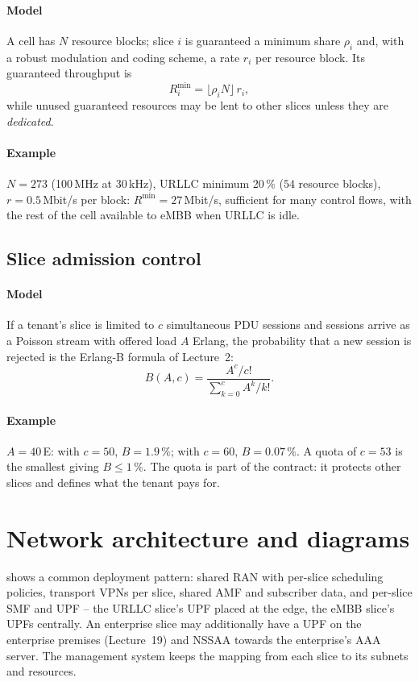 \documentclass[11pt,a4paper]{article}
\begin{document}
\paragraph{Model} A cell has $N$ resource blocks; slice $i$ is guaranteed a minimum share $\rho_i$ and, with a robust modulation and coding
scheme, a rate $r_i$ per resource block. Its guaranteed throughput is
\begin{equation}\label{eq:prb}
  R_i^{\min} = \lfloor\rho_i N\rfloor\, r_i ,
\end{equation}
while unused guaranteed resources may be lent to other slices unless they are \emph{dedicated}.
\paragraph{Example} $N = 273$ (100\,MHz at 30\,kHz), URLLC minimum 20\,\% ($54$ resource blocks), $r = 0.5$\,Mbit/s per block: $R^{\min} = 27$\,Mbit/s,
sufficient for many control flows, with the rest of the cell available to eMBB when URLLC is idle.

\subsection{Slice admission control}\label{sec:nsac}
\paragraph{Model} If a tenant's slice is limited to $c$ simultaneous PDU sessions and sessions arrive as a Poisson stream with offered load
$A$ Erlang, the probability that a new session is rejected is the Erlang-B formula of Lecture~2:
\begin{equation}\label{eq:block}
  B(A, c) = \frac{A^{c}/c!}{\sum_{k=0}^{c} A^{k}/k!} .
\end{equation}
\paragraph{Example} $A = 40$\,E: with $c = 50$, $B = 1.9\,\%$; with $c = 60$, $B = 0.07\,\%$. A quota of $c = 53$ is the smallest giving $B \le 1\,\%$.
The quota is part of the contract: it protects other slices and defines what the tenant pays for.

\section{Network architecture and diagrams}
 shows a common deployment pattern: shared RAN with per-slice scheduling policies, transport VPNs per slice, shared AMF and
subscriber data, and per-slice SMF and UPF -- the URLLC slice's UPF placed at the edge, the eMBB slice's UPFs centrally. An enterprise slice may
additionally have a UPF on the enterprise premises (Lecture~19) and NSSAA towards the enterprise's AAA server. The management system keeps the
mapping from each slice to its subnets and resources.
\end{document}
